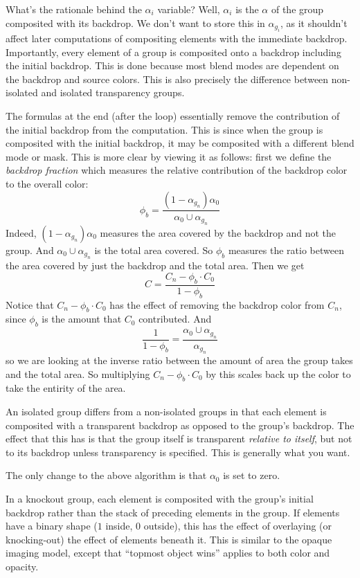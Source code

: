 What's the rationale behind the $\alpha_i$ variable?
Well, $\alpha_i$ is the $\alpha$ of the group composited with its backdrop.
We don't want to store this in $\alpha_{g_i}$, as it shouldn't affect later computations of compositing
elements with the immediate backdrop.
Importantly, every element of a group is composited onto a backdrop including the initial backdrop.
This is done because most blend modes are dependent on the backdrop and source colors.
This is also precisely the difference between non-isolated and isolated transparency groups.

The formulas at the end (after the loop) essentially remove the contribution of the initial backdrop from
the computation.
This is since when the group is composited with the initial backdrop, it may be composited with a different
blend mode or mask.
This is more clear by viewing it as follows: first we define the {\it backdrop fraction} which measures the
relative contribution of the backdrop color to the overall color:
$$ \phi_b = \frac{(1-\alpha_{g_n})\alpha_0}{\alpha_0\cup\alpha_{g_n}} $$
Indeed, $(1-\alpha_{g_n})\alpha_0$ measures the area covered by the backdrop and not the group.
And $\alpha_0\cup\alpha_{g_n}$ is the total area covered.
So $\phi_b$ measures the ratio between the area covered by just the backdrop and the total area.
Then we get
$$ C = \frac{C_n-\phi_b\cdot C_0}{1-\phi_b} $$
Notice that $C_n-\phi_b\cdot C_0$ has the effect of removing the backdrop color from $C_n$, since $\phi_b$
is the amount that $C_0$ contributed.
And
$$ \frac1{1-\phi_b} = \frac{\alpha_0\cup\alpha_{g_n}}{\alpha_{g_n}} $$
so we are looking at the inverse ratio between the amount of area the group takes and the total area.
So multiplying $C_n-\phi_b\cdot C_0$ by this scales back up the color to take the entirity of the area.


An isolated group differs from a non-isolated groups in that each element is composited with a transparent
backdrop as opposed to the group's backdrop.
The effect that this has is that the group itself is transparent {\it relative to itself}, but not to its
backdrop unless transparency is specified.
This is generally what you want.

The only change to the above algorithm is that $\alpha_0$ is set to zero.


In a knockout group, each element is composited with the group's initial backdrop rather than the stack
of preceding elements in the group.
If elements have a binary shape ($1$ inside, $0$ outside), this has the effect of overlaying (or knocking-out)
the effect of elements beneath it.
This is similar to the opaque imaging model, except that ``topmost object wins'' applies to both color and
opacity.


